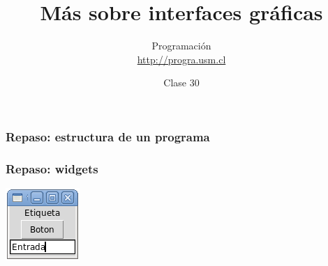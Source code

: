 \documentclass[12pt]{beamer}
\title{Más sobre interfaces gráficas}
\author{Programación \\ \url{http://progra.usm.cl}}
\date{Clase 30}
\begin{document}
  \begin{frame}
    \maketitle
  \end{frame}

  \begin{frame}
    \label{repaso-estructura}
    \frametitle{Repaso: estructura de un programa}
    \LARGE
    
  \end{frame}

  \begin{frame}
    \label{repaso-widgets}
    \frametitle{Repaso: widgets}
    \hfil
    \includegraphics[width=.5\textwidth]{programas/tkinter/capturas/widgets.png}
    \hfil
  \end{frame}
\end{document}
